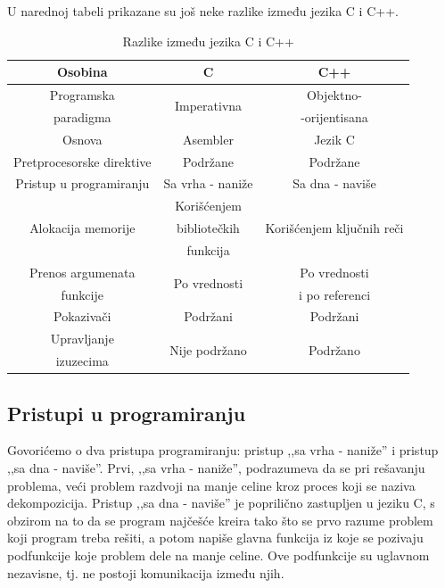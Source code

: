 \documentclass[a4paper]{article}
\begin{document}
U narednoj tabeli prikazane su još neke razlike između jezika C i C++.
\begin{table}[h!]
    \centering
    \begin{tabular}{|c|c|c|}
    \hline
    Osobina & C & C++ \\
    \hline
    Programska & \multirow{2}{5.5em}{Imperativna} & Objektno- \\
    paradigma & & -orijentisana\\
    \hline
    Osnova & Asembler & Jezik C \\
    \hline
    Pretprocesorske direktive & Podržane & Podržane\\
    \hline
    Pristup u programiranju & Sa vrha - naniže & Sa dna - naviše\\
    \hline
    \multirow{3}{4em}{Alokacija memorije} & Korišćenjem  & \multirow{3}{5.5em}{Korišćenjem ključnih reči}\\
    & bibliotečkih & \\
    & funkcija &\\
    \hline
    Prenos argumenata & \multirow{2}{5.5em}{Po vrednosti} & Po vrednosti\\
    funkcije & & i po referenci\\
    \hline
    Pokazivači & Podržani & Podržani\\
    \hline
    Upravljanje & \multirow{2}{6.2em}{Nije podržano} & \multirow{2}{4em}{Podržano} \\
    izuzecima & &\\
    \hline
    \end{tabular}
    \caption{Razlike između jezika C i C++}
    \label{tab:razlike}
\end{table}

\subsection{Pristupi u programiranju}

Govorićemo o dva pristupa programiranju: pristup ,,sa vrha - naniže'' i pristup ,,sa dna - naviše''. Prvi, ,,sa vrha - naniže'', podrazumeva da se pri rešavanju problema, veći problem razdvoji na manje celine kroz proces koji se naziva dekompozicija. Pristup ,,sa dna - naviše'' je poprilično zastupljen u jeziku C, s obzirom na to da se program najčešće kreira tako što se prvo razume problem koji program treba rešiti, a potom napiše glavna funkcija iz koje se pozivaju podfunkcije koje problem dele na manje celine. Ove podfunkcije su uglavnom nezavisne, tj. ne postoji komunikacija između njih.
\end{document}

